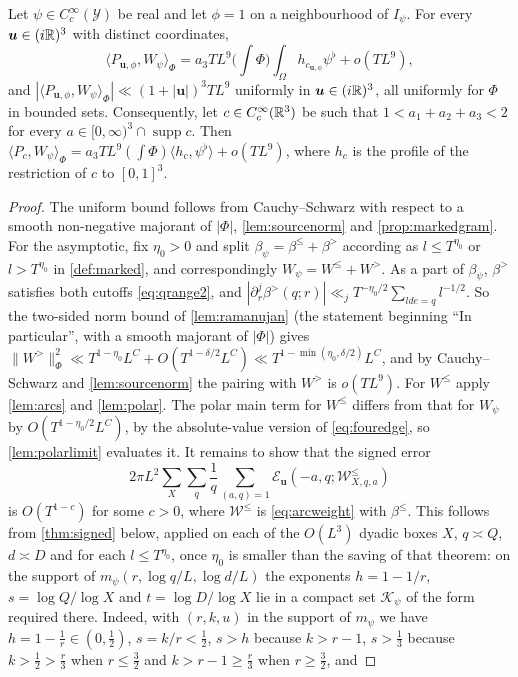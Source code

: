 \documentclass[11pt,colorlinks]{charlie}
\newcommand{\Om}{\Omega}
\newcommand{\ip}[2]{\langle #1,#2\rangle}
\begin{document}
\begin{proposition}\label{prop:mixed}
Let $\psi\in C_c^\infty(\mathcal Y)$ be real and let $\phi=1$ on a neighbourhood of $I_\psi$. For every $\boldsymbol u\in(i\mathbb{R})^3$ with distinct coordinates,
\[
 \ip{P_{\boldsymbol u,\phi}}{W_\psi}_\Phi=a_3TL^9\Big(\int\Phi\Big)\int_\Om h_{c_{\boldsymbol u,\phi}}\psi^\flat+o(TL^9),
\]
and $|\ip{P_{\boldsymbol u,\phi}}{W_\psi}_\Phi|\ll(1+|\boldsymbol u|)^3TL^9$ uniformly in $\boldsymbol u\in(i\mathbb{R})^3$, all uniformly for $\Phi$ in bounded sets. Consequently, let $c\in C_c^\infty(\mathbb{R}^3)$ be such that $1<a_1+a_2+a_3<2$ for every $a\in[0,\infty)^3\cap\operatorname{supp}c$. Then $\ip{P_c}{W_\psi}_\Phi=a_3TL^9(\int\Phi)\ip{h_c}{\psi^\flat}+o(TL^9)$, where $h_c$ is the profile of the restriction of $c$ to $[0,1]^3$.
\end{proposition}
\begin{proof}
The uniform bound follows from Cauchy--Schwarz with respect to a smooth non-negative majorant of $|\Phi|$, \cref{lem:sourcenorm} and \cref{prop:markedgram}. For the asymptotic, fix $\eta_0>0$ and split $\beta_\psi=\beta^{\le}+\beta^{>}$ according as $l\le T^{\eta_0}$ or $l>T^{\eta_0}$ in \cref{def:marked}, and correspondingly $W_\psi=W^{\le}+W^{>}$. As a part of $\beta_\psi$, $\beta^>$ satisfies both cutoffs \eqref{eq:qrange2}, and $|\partial_r^j\beta^{>}(q;r)|\ll_jT^{-\eta_0/2}\sum_{lde=q}l^{-1/2}$. So the two-sided norm bound of \cref{lem:ramanujan} (the statement beginning ``In particular'', with a smooth majorant of $|\Phi|$) gives $\|W^{>}\|_{\Phi}^2\ll T^{1-\eta_0}L^{C}+O(T^{1-\delta/2}L^C)\ll T^{1-\min(\eta_0,\delta/2)}L^C$, and by Cauchy--Schwarz and \cref{lem:sourcenorm} the pairing with $W^>$ is $o(TL^9)$. For $W^{\le}$ apply \cref{lem:arcs} and \cref{lem:polar}. The polar main term for $W^{\le}$ differs from that for $W_\psi$ by $O(T^{1-\eta_0/2}L^{C})$, by the absolute-value version of \eqref{eq:fouredge}, so \cref{lem:polarlimit} evaluates it. It remains to show that the signed error
\[
 2\pi L^2\sum_X\sum_q\frac1q\sum_{(a,q)=1}\mathcal E_{\boldsymbol u}(-a,q;\mathcal W^{\le}_{X,q,a})
\]
is $O(T^{1-c})$ for some $c>0$, where $\mathcal W^{\le}$ is \eqref{eq:arcweight} with $\beta^{\le}$. This follows from \cref{thm:signed} below, applied on each of the $O(L^3)$ dyadic boxes $X$, $q\asymp Q$, $d\asymp D$ and for each $l\le T^{\eta_0}$, once $\eta_0$ is smaller than the saving of that theorem: on the support of $m_\psi(r,\log q/L,\log d/L)$ the exponents $h=1-1/r$, $s=\log Q/\log X$ and $t=\log D/\log X$ lie in a compact set $\mathcal K_\psi$ of the form required there. Indeed, with $(r,k,u)$ in the support of $m_\psi$ we have $h=1-\frac1r\in(0,\frac12)$, $s=k/r<\frac12$, $s>h$ because $k>r-1$, $s>\frac13$ because $k>\frac12>\frac r3$ when $r\le\frac32$ and $k>r-1\ge\frac r3$ when $r\ge\frac32$, and

\end{proof}
\end{document}
